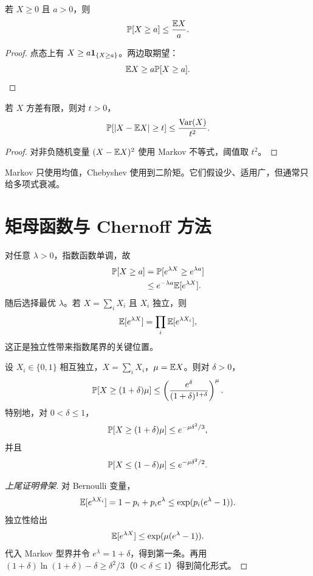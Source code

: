 \begin{theorem}
若 $X\ge0$ 且 $a>0$，则
\[
\mathbb{P}[X\ge a]\le\frac{\mathbb{E} X}{a}.
\]
\end{theorem}

\begin{proof}
点态上有 $X\ge a\mathbf{1}_{\{X\ge a\}}$。两边取期望：
\[
\mathbb{E} X\ge a\mathbb{P}[X\ge a].
\]
\end{proof}

\begin{theorem}
若 $X$ 方差有限，则对 $t>0$，
\[
\mathbb{P}[|X-\mathbb{E} X|\ge t]\le\frac{\operatorname{Var}(X)}{t^2}.
\]
\end{theorem}

\begin{proof}
对非负随机变量 $(X-\mathbb{E} X)^2$ 使用 Markov 不等式，阈值取 $t^2$。
\end{proof}

Markov 只使用均值，Chebyshev 使用到二阶矩。它们假设少、适用广，但通常只给多项式衰减。

\section{矩母函数与 Chernoff 方法}

对任意 $\lambda>0$，指数函数单调，故
\begin{align*}
\mathbb{P}[X\ge a]
&=\mathbb{P}[e^{\lambda X}\ge e^{\lambda a}]\\
&\le e^{-\lambda a}\mathbb{E}[e^{\lambda X}].
\end{align*}
随后选择最优 $\lambda$。若 $X=\sum_iX_i$ 且 $X_i$ 独立，则
\[
\mathbb{E}[e^{\lambda X}]=\prod_i\mathbb{E}[e^{\lambda X_i}],
\]
这正是独立性带来指数尾界的关键位置。

\begin{theorem}
设 $X_i\in\{0,1\}$ 相互独立，$X=\sum_iX_i$，$\mu=\mathbb{E} X$。则对 $\delta>0$，
\[
\mathbb{P}[X\ge(1+\delta)\mu]
\le\left(\frac{e^\delta}{(1+\delta)^{1+\delta}}\right)^\mu.
\]
特别地，对 $0<\delta\le1$，
\[
\mathbb{P}[X\ge(1+\delta)\mu]
\le e^{-\mu\delta^2/3},
\]
并且
\[
\mathbb{P}[X\le(1-\delta)\mu]
\le e^{-\mu\delta^2/2}.
\]
\end{theorem}

\begin{proof}[上尾证明骨架]
对 Bernoulli 变量，
\[
\mathbb{E}[e^{\lambda X_i}]
=1-p_i+p_ie^\lambda
\le\exp(p_i(e^\lambda-1)).
\]
独立性给出
\[
\mathbb{E}[e^{\lambda X}]\le\exp(\mu(e^\lambda-1)).
\]
代入 Markov 型界并令 $e^\lambda=1+\delta$，得到第一条。再用
$(1+\delta)\ln(1+\delta)-\delta\ge\delta^2/3$（$0<\delta\le1$）得到简化形式。
\end{proof}

